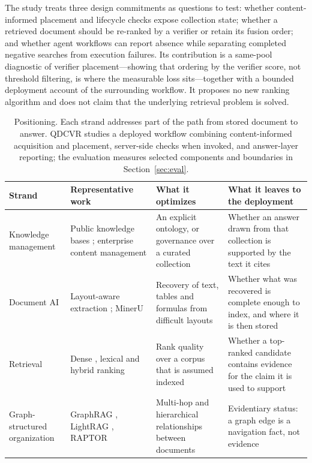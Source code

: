 The study treats three design commitments as questions to test: whether
content-informed placement and lifecycle checks expose collection state;
whether a retrieved document should be re-ranked by a verifier or retain its
fusion order; and whether agent workflows can report absence while separating
completed negative searches from execution failures. Its contribution is a
same-pool diagnostic of verifier placement---showing that ordering by the
verifier score, not threshold filtering, is where the measurable loss
sits---together with a bounded deployment account of the surrounding
workflow. It proposes no new ranking algorithm and does not claim that the
underlying retrieval problem is solved.

\begin{table}[t]
\centering
\small
\setlength{\tabcolsep}{4pt}
\renewcommand{\arraystretch}{1.18}
\caption{Positioning. Each strand addresses part of the path from stored
document to answer. QDCVR studies a deployed workflow combining content-informed
acquisition and placement, server-side checks when invoked, and answer-layer
reporting; the evaluation measures selected components and boundaries in
Section~\ref{sec:eval}.}
\label{tab:positioning}
\begin{tabular}{@{}>{\raggedright\arraybackslash}p{}>{\raggedright\arraybackslash}p{}>{\raggedright\arraybackslash}p{}>{\raggedright\arraybackslash}p{}@{}}
\toprule
Strand & Representative work & What it optimizes & What it leaves to the deployment\\
\midrule
Knowledge management & Public knowledge bases \citep{auer-dbpedia-kb-2007,hoffart-yago2-kb-2013}; enterprise content management \citep{paivarinta-ecm-2005,tyrvaainen-ecm-2006} & An explicit ontology, or governance over a curated collection & Whether an answer drawn from that collection is supported by the text it cites\\
Document AI & Layout-aware extraction \citep{zhong-publaynet-layout-2019,huang-layoutlmv3-docai-2022}; MinerU \citep{mineru} & Recovery of text, tables and formulas from difficult layouts & Whether what was recovered is complete enough to index, and where it is then stored\\
Retrieval & Dense \citep{dpr}, lexical \citep{bm25} and hybrid ranking \citep{rrf-cormack,bge-m3} & Rank quality over a corpus that is assumed indexed & Whether a top-ranked candidate contains evidence for the claim it is used to support\\
Graph-structured organization & GraphRAG \citep{graphrag}, LightRAG \citep{lightrag}, RAPTOR \citep{raptor} & Multi-hop and hierarchical relationships between documents & Evidentiary status: a graph edge is a navigation fact, not evidence\\

\end{tabular}
\end{table}
